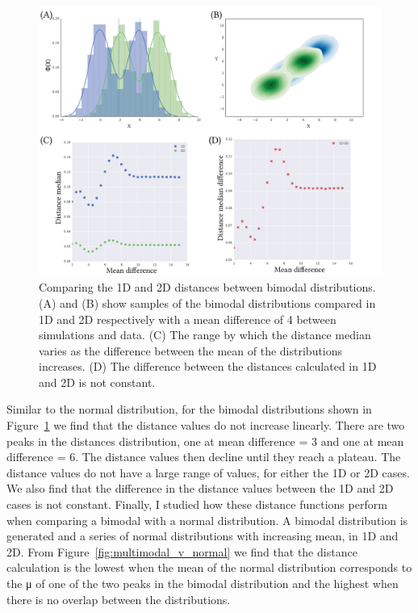 \begin{figure}[tb]
\centering
\includegraphics[scale=0.7]{../../chapters/chapterABCFlow/images/multimodal_musd.png}
\caption[Distance value ranges of bimodal distributions using the kernel distance]{\label{fig:multimodal_musd}Comparing the 1D and 2D distances between bimodal distributions. (A) and (B) show samples of the bimodal distributions compared in 1D and 2D respectively with a mean difference of 4 between simulations and data. (C) The range by which the distance median varies as the difference between the mean of the distributions increases. (D) The difference between the distances calculated in 1D and 2D is not constant.}

\end{figure}

Similar to the normal distribution, for the bimodal distributions shown in Figure~\ref{fig:multimodal_musd} we find that the distance values do not increase linearly. There are two peaks in the distances distribution, one at mean difference = 3 and one at mean difference = 6. The distance values then decline until they reach a plateau. The distance values do not have a large range of values, for either the 1D or 2D cases. We also find that the difference in the distance values between the 1D and 2D cases is not constant. Finally, I studied how these distance functions perform when comparing a bimodal with a normal distribution. A bimodal distribution is generated and a series of normal distributions with increasing mean, in 1D and 2D. From Figure~\ref{fig:multimodal_v_normal} we find that the distance calculation is the lowest when the mean of the normal distribution corresponds to the μ of one of the two peaks in the bimodal distribution and the highest when there is no overlap between the distributions.


